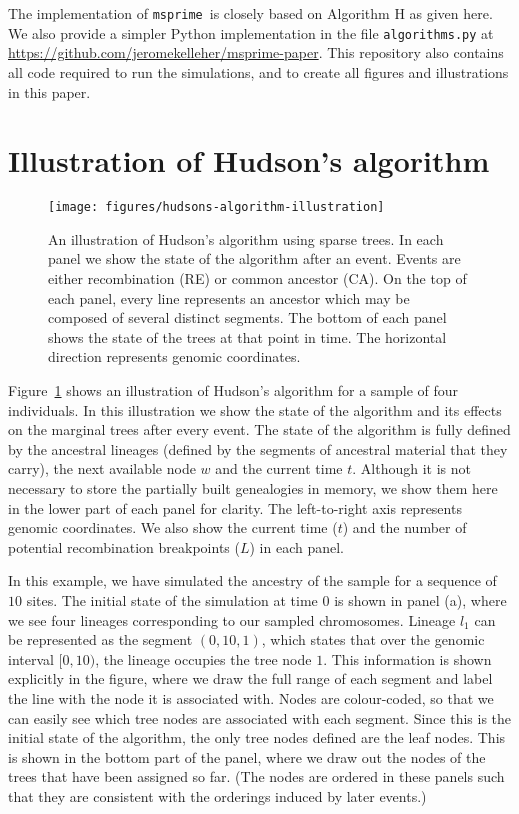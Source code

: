 \documentclass[10pt]{article}
\newcommand{\msprime}[0]{\texttt{msprime}}
\begin{document}
The implementation of \msprime\ is closely based on Algorithm H as given here.
We also provide a simpler Python implementation in the file
\texttt{algorithms.py} at
\url{https://github.com/jeromekelleher/msprime-paper}. This repository also
contains all code required to run the simulations, and to create all figures
and illustrations in this paper.

\section{Illustration of Hudson's algorithm}
\label{app-algorithm-illustration}

\begin{figure}
    \begin{center}
        \texttt{[image: figures/hudsons-algorithm-illustration]}
    \end{center}
    \caption{\label{fig-hudsons-algorithm-illustration} An illustration
    of Hudson's algorithm using sparse trees. In each
    panel we show the state of the algorithm after an event. Events
    are either recombination (RE) or common ancestor (CA). On the top
    of each panel, every line represents an ancestor which may
    be composed of several distinct segments. The bottom of each
    panel shows the state of the trees at that point in time. The
    horizontal direction represents genomic coordinates.
    }
\end{figure}

Figure~\ref{fig-hudsons-algorithm-illustration} shows an illustration of
Hudson's algorithm for a sample of four individuals. In this illustration we
show the state of the algorithm and its effects on the marginal trees after
every event. The state of the algorithm is fully defined by the ancestral
lineages (defined by the segments of ancestral material that they carry),
the next available node $w$ and the current time $t$. Although it is
not necessary to store the partially built genealogies in memory, we show them
here in the lower part of each panel for clarity. The left-to-right axis
represents genomic coordinates. We also show the current time ($t$)
and the number of potential recombination breakpoints ($L$) in each panel.

In this example, we have simulated the ancestry of the sample for a sequence of
$10$ sites. The initial state of the simulation at time $0$ is shown in panel
(a), where we see four lineages corresponding to our sampled chromosomes.
Lineage $l_1$ can be represented as the segment $(0, 10, 1)$, which states that
over the genomic interval $[0, 10)$, the lineage occupies the tree node $1$.
This information is shown explicitly in the figure, where we draw the full range
of each segment and label the line with the node it is associated with.  Nodes
are colour-coded, so that we can easily see which tree nodes are associated
with each segment. Since this is the initial state of the algorithm, the only
tree nodes defined are the leaf nodes. This is shown in the bottom part of the
panel, where we draw out the nodes of the trees that have been assigned so far.
(The nodes are ordered in these panels such that they are consistent with the
orderings induced by later events.)
\end{document}
